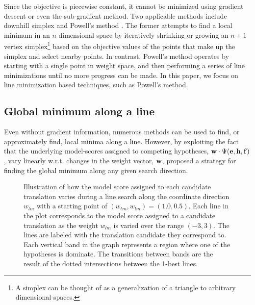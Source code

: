 \documentclass[11pt]{article}
\begin{document}
Since the objective is piecewise constant, it cannot be minimized using gradient descent or even the sub-gradient method. Two applicable methods include downhill simplex and Powell's method \cite{press2007}. The former attempts to find a local minimum in an $n$ dimensional space by iteratively shrinking or growing an $n+1$ vertex simplex\footnote{A simplex can be thought of as a generalization of a triangle to arbitrary dimensional spaces.} based on the objective values of the points that make up the simplex and select nearby points.	In contrast, Powell's method operates by starting with a single point in weight space, and then performing a series of line minimizations until no more progress can be made. In this paper, we focus on line minimization based techniques, such as Powell's method.  

\subsection{Global minimum along a line}

Even without gradient information, numerous methods can be used to find, or approximately find, local minima along a line. However, by exploiting the fact that the underlying model-scores assigned to competing hypotheses,  ${\bf w} \cdot \Psi({\bf e}, {\bf h}, {\bf f})$, vary linearly w.r.t. changes in the weight vector, ${\bf w}$,  proposed a strategy for finding the global minimum along any given search direction. 

\begin{figure}[h]
\vskip 0.2in
\begin{center}
\setlength{\epsfxsize}{2.5in}
\centerline{}
\vskip -0.15in
\caption{Illustration of how the model score assigned to each candidate translation varies during a line search along the coordinate direction $w_{lm}$ with a starting point of $(w_{tm}, w_{lm}) = (1.0, 0.5)$. Each line in the plot corresponds to the model score assigned to a candidate translation as the weight $w_{lm}$ is varied over the range $(-3,3)$.  The lines are labeled with the translation candidate they correspond to. Each vertical band in the graph represents a region where one of the hypotheses is dominate. The transitions between bands are the result of the dotted intersections between the 1-best lines.
\label{mertlinesearch}
}
\end{center}
\vskip -0.2in
\end{figure}
\end{document}
